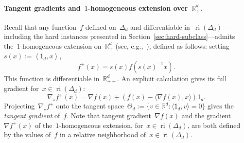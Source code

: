 \documentclass[11pt]{article}
\numberwithin{equation}{section}
\theoremstyle{remark}
\newcommand{\R}{\mathbb{R}}
\newcommand{\ip}[2]{\left\langle #1,#2\right\rangle}
\newcommand{\ones}{\mathsf{1}_d}
\newcommand{\ri}{\operatorname{ri}}
\newcommand{\Simp}{\Delta_d}
\newcommand{\Tan}{\Theta_d}
\newcommand{\1}{\mathbf{1}}
\newcommand{\bnabla}{\nabla}
\begin{document}
\paragraph{Tangent gradients and~$1$-homogeneous extension over~$\R^d_+$.}
Recall that any function~$f$ defined on~$\Simp$ and differentiable in~$\ri(\Simp)$---including the hard instances presented in Section~\ref{sec:hard-subclass}---admits the~1-homogeneous extension on~$\R^d_+$ (see, e.g.,~\cite{ovcharov2018proper}), defined as follows: setting~$s(x) := \ip{\ones}{x}$,
\begin{equation}
\label{eq:conic-extension}
f^+(x) = s(x) f (s(x)^{-1}x).
\end{equation}
This function is differentiable in~$\R^d_{++}$. 
An explicit calculation gives its full gradient for~$x \in \ri(\Simp)$:
\begin{equation}
\label{eq:grad-conic}
\nabla_\star f^+(x) = \bnabla f(x) + (f(x) - \langle \bnabla f(x), x \rangle) \ones.
\end{equation}
\iffalse
Projecting~$\nabla_\star f^+$ onto the tangent space~$\Tan := \{v \in \R^d: \langle \ones, v \rangle = 0\}$ gives the {\em tangent gradient} of~$f$.
Note that tangent gradient~$\bnabla f(x)$ and the gradient~$\nabla f^+(x)$ of the~$1$-homogeneous extension, for~$x \in \ri(\Simp)$, are both defined by the values of~$f$ in a {relative} neighborhood of~$x \in \ri(\Simp)$.
%
%
\end{document}
